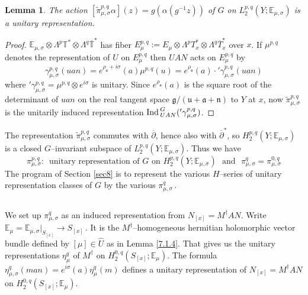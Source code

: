 \documentclass{conm-p-l}
\newtheorem{lemma}[equation]{Lemma}
\renewcommand{\gg}{\mathfrak{g}}
\def\ga{\mathfrak{a}}
\def\gg{\mathfrak{g}}
\def\gn{\mathfrak{n}}
\def\gu{\mathfrak{u}}
\def\Ind{{\rm Ind\,}}
\def\E{\mathbb{E}}
\def\T{\mathbb{T}}
\begin{document}
\begin{lemma}\label{8.1.9}
The action $[\widetilde{\pi}^{p,q}_{\mu,\sigma}\alpha](z)
= g(\alpha(g^{-1}z))$ of $G$ on $L_2^{p,q}(Y;\E_{\mu,\sigma})$ is a
unitary representation.
\end{lemma}
\begin{proof}
$\E_{\mu,\sigma}\otimes \Lambda^p\T^* \otimes \Lambda^q\overline{\T}^*$ has 
fiber $E_\mu^{p,q} := E_\mu \otimes \Lambda^p T_x^* \otimes 
\Lambda^q\overline{T}_x^*$ over $x$.  If $\mu^{p,q}$ denotes the 
representation of $U$ on $E_\mu^{p,q}$ then $UAN$ acts on $E_\mu^{p,q}$ by
$$
\gamma_{\mu,\sigma}^{p,q}(uan) = e^{\rho_\ga + i\sigma}(a)\mu^{p,q}(u)
	= e^{\rho_\ga}(a)\cdot {'\gamma}_{\mu,\sigma}^{p,q}(uan)
$$
where $'\gamma_{\mu,\sigma}^{p,q} = \mu^{p,q}\otimes e^{i\sigma}$ is
unitary. Since $e^{\rho_\ga}(a)$ is the square root of the determinant of
$uan$ on the real tangent space $\gg/(\gu + \ga + \gn)$ to $Y$ at $x$,
now $\widetilde{\pi}^{p,q}_{\mu,\sigma}$ is the unitarily induced 
representation $\Ind_{UAN}^G({'\gamma}_{\mu,\sigma}^{p,q})$.
\end{proof}

The representation $\widetilde{\pi}^{p,q}_{\mu,\sigma}$ commutes
with $\overline{\partial}$, hence also with $\overline{\partial}^*$, so
$H_2^{p,q}(Y;\E_{\mu,\sigma})$ is a closed $G$--invariant subspace of
$L_2^{p,q}(Y;\E_{\mu,\sigma})$.  Thus we have
\begin{equation}\label{8.1.10}
{\pi}^{p,q}_{\mu,\sigma}:\,\text{ unitary representation
	of $G$ on } H_2^{p,q}(Y;\E_{\mu,\sigma})\,\,\text{ and }\,\,
	{\pi}_{\mu,\sigma}^q = {\pi}^{0,q}_{\mu,\sigma}
\end{equation}
The program of Section \ref{sec8} is to represent the various $H$--series of
unitary representation classes of $G$ by the various ${\pi}_{\mu,\sigma}^q$\,.

\subsection{}\label{ssec8b}\setcounter{equation}{0}
We set up ${\pi}_{\mu,\sigma}^q$ as an induced representation from
$N_{[x]} = M^\dagger AN$.  Write 
$\E_\mu = \E_{\mu,\sigma}|_{S_{[x]}} \to S_{[x]}$\,.  It is the 
$M^\dagger$--homogeneous hermitian holomorphic vector bundle defined by
$[\mu] \in \widehat{U}$ as in Lemma \ref{7.1.4}.  That gives us the unitary
representations $\eta_\mu^q$ of $M^\dagger$ on $H_2^{0,q}(S_{[x]};\E_\mu)$.
The formula $\eta_{\mu,\sigma}^q(man) = e^{i\sigma}(a)\eta_\mu^q(m)$
defines a unitary representation of $N_{[x]} = M^\dagger AN$ on
$H_2^{0,q}(S_{[x]};\E_\mu)$.
\end{document}
